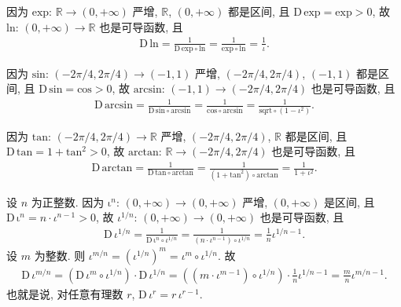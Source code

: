 \begin{example}
    因为 $\mathrm{exp}$: $\mathbb{R} \to (0, +\infty)$ 严增, $\mathbb{R}$, $(0, +\infty)$ 都是区间, 且 $\mathrm{D}\, \mathrm{exp} = \mathrm{exp} > 0$, 故 $\mathrm{ln}$: $(0, +\infty) \to \mathbb{R}$ 也是可导函数, 且
    \begin{align*}
        \mathrm{D}\, \mathrm{ln} = \frac{1}{\mathrm{D}\, \mathrm{exp} \circ \mathrm{ln}} = \frac{1}{\mathrm{exp} \circ \mathrm{ln}} = \frac{1}{\iota}.
    \end{align*}

    因为 $\mathrm{sin}$: $(-2\pi/4, 2\pi/4) \to (-1, 1)$ 严增, $(-2\pi/4, 2\pi/4)$, $(-1, 1)$ 都是区间, 且 $\mathrm{D}\, \mathrm{sin} = \mathrm{cos} > 0$, 故 $\mathrm{arcsin}$: $(-1, 1) \to (-2\pi/4, 2\pi/4)$ 也是可导函数, 且
    \begin{align*}
        \mathrm{D}\, \mathrm{arcsin} = \frac{1}{\mathrm{D}\, \mathrm{sin} \circ \mathrm{arcsin}} = \frac{1}{\mathrm{cos} \circ \mathrm{arcsin}} = \frac{1}{\mathrm{sqrt} \circ (1 - \iota^2)}.
    \end{align*}

    因为 $\mathrm{tan}$: $(-2\pi/4, 2\pi/4) \to \mathbb{R}$ 严增, $(-2\pi/4, 2\pi/4)$, $\mathbb{R}$ 都是区间, 且 $\mathrm{D}\, \mathrm{tan} = 1 + \mathrm{tan}^2 > 0$, 故 $\mathrm{arctan}$: $\mathbb{R} \to (-2\pi/4, 2\pi/4)$ 也是可导函数, 且
    \begin{align*}
        \mathrm{D}\, \mathrm{arctan} = \frac{1}{\mathrm{D}\, \mathrm{tan} \circ \mathrm{arctan}} = \frac{1}{(1 + \mathrm{tan}^2) \circ \mathrm{arctan}} = \frac{1}{1 + \iota^2}.
    \end{align*}

    设 $n$ 为正整数. 因为 $\mathrm{\iota}^n$: $(0, +\infty) \to (0, +\infty)$ 严增, $(0, +\infty)$ 是区间, 且 $\mathrm{D}\, \mathrm{\iota}^n = n \cdot \iota^{n-1} > 0$, 故 $\iota^{1/n}$: $(0, +\infty) \to (0, +\infty)$ 也是可导函数, 且
    \begin{align*}
        \mathrm{D}\, \iota^{1/n} = \frac{1}{\mathrm{D}\, \mathrm{\iota}^n \circ \iota^{1/n}} = \frac{1}{(n \cdot \iota^{n-1}) \circ \iota^{1/n}} = \frac{1}{n} \iota^{1/n - 1}.
    \end{align*}
    设 $m$ 为整数. 则 $\iota^{m/n} = (\iota^{1/n})^m = \iota^m \circ \iota^{1/n}$. 故
    \begin{align*}
        \mathrm{D}\, \iota^{m/n} = ({\mathrm{D}\, \iota^m} \circ {\iota^{1/n}}) \cdot {\mathrm{D}\, \iota^{1/n}} = ((m \cdot \iota^{m-1}) \circ \iota^{1/n}) \cdot \frac{1}{n} \iota^{1/n - 1} = \frac{m}{n} \iota^{m/n - 1}.
    \end{align*}
    也就是说, 对任意有理数 $r$, $\mathrm{D}\, \iota^r = r\,\iota^{r - 1}$.
\end{example}

